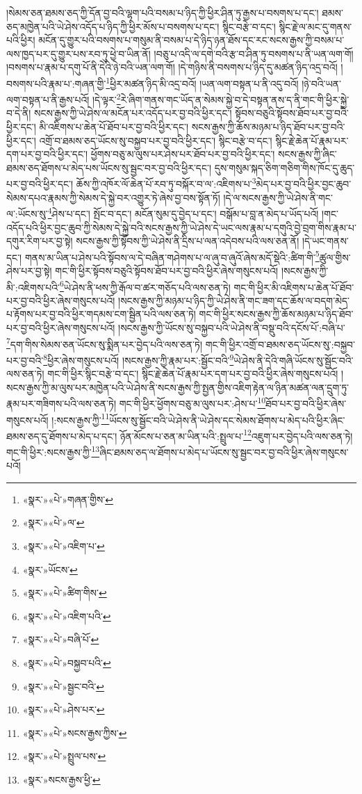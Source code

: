 །སེམས་ཅན་ཐམས་ཅད་ཀྱི་དོན་བྱ་བའི་ལྷག་པའི་བསམ་པ་ཉིད་ཀྱི་ཕྱིར་ཤིན་ཏུ་རྒྱས་པ་བསགས་པ་དང་། ཐམས་ཅད་མཁྱེན་པའི་ཡེ་ཤེས་འདོད་པ་ཉིད་ཀྱི་ཕྱིར་མོས་པ་བསགས་པ་དང་། སྙིང་བརྩེ་བ་དང་། སྙིང་རྗེ་ལ་མང་དུ་གནས་པའི་ཕྱིར། མངོན་དུ་གྱུར་པའི་བསགས་པ་གསུམ་ནི་བསམ་པ་དེ་ཉིད་ཉན་ཐོས་དང་རང་སངས་རྒྱས་ཀྱི་བསམ་པ་ལས་ཁྱད་པར་དུ་གྱུར་པས་རབ་ཏུ་ཕྱེ་བ་ཡིན་ནོ། །བཅུ་པ་འདི་ལ་དགེ་བའི་རྩ་བ་ཤིན་ཏུ་བསགས་པ་ནི་ཡན་ལག་གོ། །བསགས་པ་རྣམ་པ་དགུ་པོ་ནི་དེའི་ཉེ་བའི་ཡན་ལག་གོ། །དེ་གཉིས་ནི་བསགས་པ་ཉིད་དུ་མཚན་ཉིད་འདྲ་བའོ། །བསགས་པའི་རྣམ་པ་:གཞན་གྱི་\footnote{«སྣར་»«པེ་»གཞན་གྱིས་}ཕྱིར་མཚན་ཉིད་མི་འདྲ་བའོ། །ཡན་ལག་བསྟན་པ་ནི་འདུ་བའོ། །ཉེ་བའི་ཡན་ལག་བསྟན་པ་ནི་རྒྱས་པའོ། །དེ་ལྟར་\footnote{«སྣར་»«པེ་»ལ་}རེ་ཞིག་གནས་གང་ཡོད་ན་སེམས་སྐྱེ་བ་དེ་བསྟན་ནས་ད་ནི་གང་གི་ཕྱིར་སྐྱེ་བ་དེ་ནི། སངས་རྒྱས་ཀྱི་ཡེ་ཤེས་ལ་མངོན་པར་འདོད་པར་བྱ་བའི་ཕྱིར་དང་། སྟོབས་བཅུའི་སྟོབས་ཐོབ་པར་བྱ་བའི་ཕྱིར་དང་། མི་འཇིགས་པ་ཆེན་པོ་ཐོབ་པར་བྱ་བའི་ཕྱིར་དང་། སངས་རྒྱས་ཀྱི་ཆོས་མཉམ་པ་ཉིད་ཐོབ་པར་བྱ་བའི་ཕྱིར་དང་། འགྲོ་བ་ཐམས་ཅད་ཡོངས་སུ་བསྐྱབ་པར་བྱ་བའི་ཕྱིར་དང་། སྙིང་བརྩེ་བ་དང་། སྙིང་རྗེ་ཆེན་པོ་རྣམ་པར་དག་པར་བྱ་བའི་ཕྱིར་དང་། ཕྱོགས་བཅུ་མ་ལུས་པར་ཤེས་པར་ཐོབ་པར་བྱ་བའི་ཕྱིར་དང་། སངས་རྒྱས་ཀྱི་ཞིང་ཐམས་ཅད་ཐོགས་པ་མེད་པས་ཡོངས་སུ་སྦྱང་བར་བྱ་བའི་ཕྱིར་དང་། དུས་གསུམ་སྐད་ཅིག་གཅིག་གིས་ཁོང་དུ་ཆུད་པར་བྱ་བའི་ཕྱིར་དང་། ཆོས་ཀྱི་འཁོར་ལོ་ཆེན་པོ་རབ་ཏུ་བསྐོར་བ་ལ་:འཇིགས་པ་\footnote{«སྣར་»«པེ་»འཇིག་པ་}མེད་པར་བྱ་བའི་ཕྱིར་བྱང་ཆུབ་སེམས་དཔའ་རྣམས་ཀྱི་སེམས་དེ་སྐྱེ་བར་འགྱུར་ཏེ་ཞེས་བྱ་བས་སྟོན་ཏོ། །དེ་ལ་སངས་རྒྱས་ཀྱི་ཡེ་ཤེས་ནི་གང་ལ་:ཡོངས་སུ་\footnote{«སྣར་»ཡོངས་}ཤེས་པ་དང་། སྤོང་བ་དང་། མངོན་སུམ་དུ་བྱེད་པ་དང་། བསྒོམ་པ་བླ་ན་མེད་པ་ཡོད་པའོ། །གང་འདོད་པའི་ཕྱིར་བྱང་ཆུབ་ཀྱི་སེམས་དེ་སྐྱེ་བའི་སངས་རྒྱས་ཀྱི་ཡེ་ཤེས་དེ་ཡང་ལས་རྣམ་པ་དགུའི་བྱེ་བྲག་གིས་རྣམ་པ་དགུར་རིག་པར་བྱ་སྟེ། སངས་རྒྱས་ཀྱི་སྟོབས་ཀྱི་ཡེ་ཤེས་ནི་དྲིས་པ་ལན་འདེབས་པའི་ལས་ཅན་ནོ། །དེ་ཡང་གནས་དང་། གནས་མ་ཡིན་པ་ཤེས་པའི་སྟོབས་ལ་དེ་བཞིན་གཤེགས་པ་ལ་ཞུ་བ་ཞུའོ་ཞེས་མདོ་སྡེའི་:ཚིག་གི་\footnote{«སྣར་»«པེ་»ཚིག་གིས་}ཚུལ་གྱིས་ཤེས་པར་བྱ་སྟེ། གང་གི་ཕྱིར་སྟོབས་བཅུའི་སྟོབས་ཐོབ་པར་བྱ་བའི་ཕྱིར་ཞེས་གསུངས་པའོ། །སངས་རྒྱས་ཀྱི་མི་:འཇིགས་པའི་\footnote{«སྣར་»«པེ་»འཇིག་པའི་}ཡེ་ཤེས་ནི་ཕས་ཀྱི་རྒོལ་བ་ཚར་གཅོད་པའི་ལས་ཅན་ཏེ། གང་གི་ཕྱིར་མི་འཇིགས་པ་ཆེན་པོ་ཐོབ་པར་བྱ་བའི་ཕྱིར་ཞེས་གསུངས་པའོ། །སངས་རྒྱས་ཀྱི་མཉམ་པ་ཉིད་ཀྱི་ཡེ་ཤེས་ནི་གང་ཟག་དང་ཆོས་ལ་བདག་མེད་པ་རྟོགས་པར་བྱ་བའི་ཕྱིར་གདམས་ངག་སྦྱིན་པའི་ལས་ཅན་ཏེ། གང་གི་ཕྱིར་སངས་རྒྱས་ཀྱི་ཆོས་མཉམ་པ་ཉིད་ཐོབ་པར་བྱ་བའི་ཕྱིར་ཞེས་གསུངས་པའོ། །སངས་རྒྱས་ཀྱི་ཡོངས་སུ་བསྐྱབ་པའི་ཡེ་ཤེས་ནི་བསྡུ་བའི་དངོས་པོ་:བཞི་པ་\footnote{«སྣར་»«པེ་»བཞི་པོ་}དག་གིས་སེམས་ཅན་ཡོངས་སུ་སྨིན་པར་བྱེད་པའི་ལས་ཅན་ཏེ། གང་གི་ཕྱིར་འགྲོ་བ་ཐམས་ཅད་ཡོངས་སུ་:བསྐྱབ་པར་བྱ་བའི་\footnote{«སྣར་»«པེ་»བསྐྱབ་པའི་}ཕྱིར་ཞེས་གསུངས་པའོ། །སངས་རྒྱས་ཀྱི་རྣམ་པར་:སྦྱོང་བའི་\footnote{«སྣར་»«པེ་»སྦྱང་བའི་}ཡེ་ཤེས་ནི་དེའི་གཞི་ཡོངས་སུ་སྦྱོང་བའི་ལས་ཅན་ཏེ། གང་གི་ཕྱིར་སྙིང་བརྩེ་བ་དང་། སྙིང་རྗེ་ཆེན་པོ་རྣམ་པར་དག་པར་བྱ་བའི་ཕྱིར་ཞེས་གསུངས་པའོ། །སངས་རྒྱས་ཀྱི་མ་ལུས་པར་མཁྱེན་པའི་ཡེ་ཤེས་ནི་སངས་རྒྱས་ཀྱི་སྤྱན་གྱིས་འཇིག་རྟེན་ལ་ཉིན་མཚན་ལན་དྲུག་ཏུ་རྣམ་པར་གཟིགས་པའི་ལས་ཅན་ཏེ། གང་གི་ཕྱིར་ཕྱོགས་བཅུ་མ་ལུས་པར་:ཤེས་པ་\footnote{«སྣར་»«པེ་»ཤེས་པར་}ཐོབ་པར་བྱ་བའི་ཕྱིར་ཞེས་གསུངས་པའོ། །:སངས་རྒྱས་ཀྱི་\footnote{«སྣར་»«པེ་»སངས་རྒྱས་ཀྱིས་}ཡོངས་སུ་སྦྱོང་བའི་ཡེ་ཤེས་ནི་ཡེ་ཤེས་དང་སེམས་ཐོགས་པ་མེད་པའི་ཕྱིར་ཞིང་ཐམས་ཅད་དུ་ཐོགས་པ་མེད་པ་དང་། ཉོན་མོངས་པ་ཅན་མ་ཡིན་པའི་:སྤྲུལ་པ་\footnote{«སྣར་»«པེ་»སྤྲུལ་པས་}འཇུག་པར་བྱེད་པའི་ལས་ཅན་ཏེ། གང་གི་ཕྱིར་:སངས་རྒྱས་ཀྱི་\footnote{«སྣར་»སངས་རྒྱས་ཕྱི་}ཞིང་ཐམས་ཅད་ལ་ཐོགས་པ་མེད་པ་ཡོངས་སུ་སྦྱང་བར་བྱ་བའི་ཕྱིར་ཞེས་གསུངས་པའོ། 